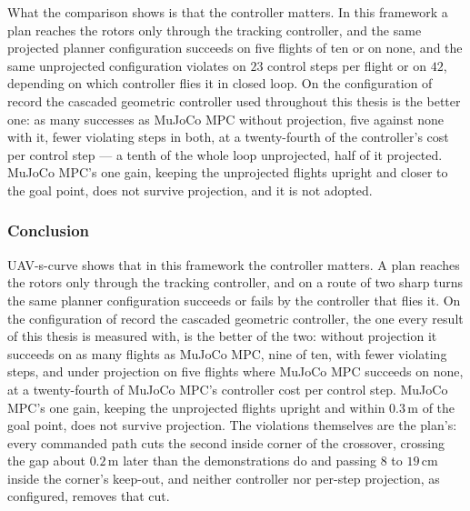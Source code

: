 What the comparison shows is that the controller matters. In this framework a plan reaches the rotors only
through the tracking controller, and the same projected planner configuration succeeds on five flights of ten or on none, and
the same unprojected configuration violates on $23$ control steps per flight or on $42$, depending on which
controller flies it in closed loop. On the configuration of record the cascaded geometric controller used throughout this thesis is
the better one: as many successes as MuJoCo MPC without projection, five against none with it, fewer violating
steps in both, at a twenty-fourth of the controller's cost per control step --- a tenth of the whole loop
unprojected, half of it projected. MuJoCo MPC's one gain, keeping the unprojected
flights upright and closer to the goal point, does not survive projection, and it is not adopted.

\FloatBarrier
\subsubsection{Conclusion}\label{sec:res:uav:scurve:conclusion}

UAV-s-curve shows that in this framework the controller matters. A plan reaches the rotors only through the
tracking controller, and on a route of two sharp turns the same planner configuration succeeds or fails by the controller that
flies it. On the configuration of record the cascaded geometric controller, the one every result of this
thesis is measured with, is the better of the two: without projection it succeeds on as many flights as
MuJoCo MPC, nine of ten, with fewer violating steps, and under projection on five flights where MuJoCo MPC
succeeds on none, at a twenty-fourth of MuJoCo MPC's controller cost per control step. MuJoCo MPC's one gain,
keeping
the unprojected flights upright and within $0.3$\,m of the goal point, does not survive projection. The
violations themselves are the plan's: every commanded path cuts the second inside corner of the crossover,
crossing the gap about $0.2$\,m later than the demonstrations do and passing $8$ to $19$\,cm inside the
corner's keep-out, and neither controller nor per-step projection, as configured, removes that cut.


